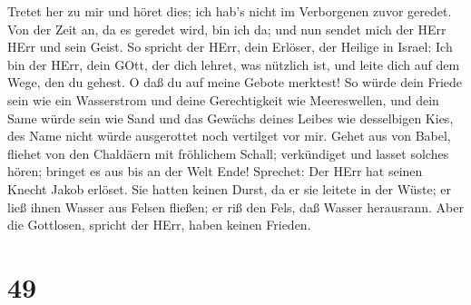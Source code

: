 Tretet her zu mir und höret dies; ich hab's nicht im Verborgenen zuvor
geredet. Von der Zeit an, da es geredet wird, bin ich da; und nun sendet
mich der HErr HErr und sein Geist.  So spricht der HErr,
dein Erlöser, der Heilige in Israel: Ich bin der HErr, dein GOtt, der
dich lehret, was nützlich ist, und leite dich auf dem Wege, den du
gehest.  O daß du auf meine Gebote merktest! So würde dein
Friede sein wie ein Wasserstrom und deine Gerechtigkeit wie
Meereswellen,  und dein Same würde sein wie Sand und das
Gewächs deines Leibes wie desselbigen Kies, des Name nicht würde
ausgerottet noch vertilget vor mir.  Gehet aus von Babel,
fliehet von den Chaldäern mit fröhlichem Schall; verkündiget und lasset
solches hören; bringet es aus bis an der Welt Ende! Sprechet: Der HErr
hat seinen Knecht Jakob erlöset.  Sie hatten keinen Durst,
da er sie leitete in der Wüste; er ließ ihnen Wasser aus Felsen fließen;
er riß den Fels, daß Wasser herausrann.  Aber die
Gottlosen, spricht der HErr, haben keinen Frieden.

\hypertarget{section-48}{%
\section{49}\label{section-48}}

